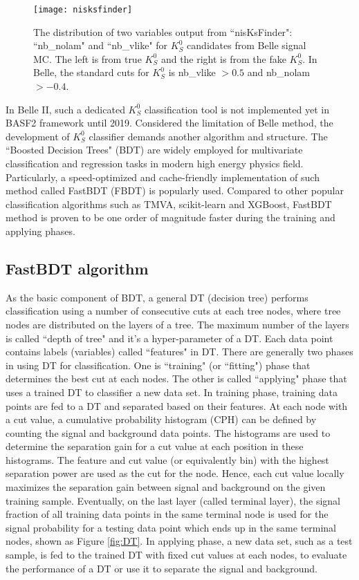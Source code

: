 \begin{figure}[htpb]
	\centering 
	\texttt{[image: nisksfinder]}
	\caption{The distribution of two variables output from ``nisKsFinder": ``nb\_nolam" and ``nb\_vlike" for $K_S^0$ candidates from Belle signal MC. The left is from true $K_S^0$ and the right is from the fake $K_S^0$. In Belle, the standard cuts for $K_S^0$ is nb\_vlike $> 0.5$ and nb\_nolam $> -0.4$\cite{kang2020measurement}.}
	\label{b1niskf}
\end{figure}


In Belle II, such a dedicated $K_S^0$ classification tool is not implemented yet in BASF2 framework until 2019. Considered the limitation of Belle method, the development of $K_S^0$ classifier demands another algorithm and structure. The ``Boosted Decision Trees" (BDT) are widely employed for multivariate classification and regression tasks in modern high energy physics field. Particularly, a speed-optimized and cache-friendly
implementation of such method called FastBDT (FBDT) is popularly used\cite{keck2016fastbdt}. Compared to other popular classification algorithms such as TMVA, scikit-learn and XGBoost, FastBDT method is proven to be one order of magnitude faster during the training and applying phases\cite{keck2016fastbdt}. 


\subsection{FastBDT algorithm}
As the basic component of BDT, a general DT (decision tree) performs classification using a number of consecutive cuts at each tree nodes, where tree nodes are distributed on the layers of a tree. The maximum number of the layers is called ``depth of tree" and it's a hyper-parameter of a DT. Each data point contains labels (variables) called ``features" in DT. There are generally two phases in using DT for classification. One is ``training" (or ``fitting") phase that determines the best cut at each nodes. The other is called ``applying" phase that uses a trained DT to classifier a new data set. In training phase, training data points are fed to a DT and separated based on their features. At each node with a cut value, a cumulative probability histogram (CPH) can be defined by counting the signal and background data points. The histograms are used to determine the separation gain for a cut value at each position in these histograms. The feature and cut value (or
equivalently bin) with the highest separation power are used as the cut for the node. Hence, each cut value locally maximizes the separation gain between signal and background on the given
training sample. Eventually, on the last layer (called terminal layer), the signal fraction of all training data points in the same terminal node is used for the signal probability for a testing data point which ends up in the same terminal nodes, shown as Figure \ref{fig:DT}. In applying phase, a new data set, such as a test sample, is fed to the trained DT with fixed cut values at each nodes, to evaluate the performance of a DT or use it to separate the signal and background.


